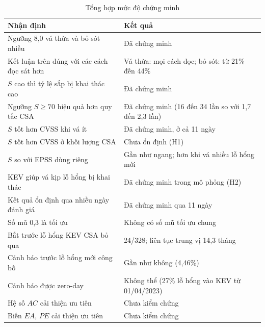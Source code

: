\documentclass[conference]{IEEEtran}
\begin{document}
\begin{table}[htbp]
\caption{Tổng hợp mức độ chứng minh}\label{tab:tonghop}
\centering
\small
\begin{tabular}{L{4.5cm}L{3.2cm}}
\toprule
Nhận định & Kết quả \\
\midrule
Ngưỡng 8,0 vá thừa và bỏ sót nhiều & Đã chứng minh \\
Kết luận trên đúng với các cách đọc sát hơn & Vá thừa: mọi cách đọc; bỏ sót: từ 21\% đến 44\% \\
$S$ cao thì tỷ lệ sắp bị khai thác cao & Đã chứng minh \\
Ngưỡng $S \ge 70$ hiệu quả hơn quy tắc CSA & Đã chứng minh (16 đến 34 lần so với 1,7 đến 2,3 lần) \\
$S$ tốt hơn CVSS khi vá ít & Đã chứng minh, ở cả 11 ngày \\
$S$ tốt hơn CVSS ở khối lượng CSA & Chưa ổn định (H1) \\
$S$ so với EPSS dùng riêng & Gần như ngang; hơn khi vá nhiều lỗ hổng mới \\
KEV giúp vá kịp lỗ hổng bị khai thác & Đã chứng minh trong mô phỏng (H2) \\
Kết quả ổn định qua nhiều ngày đánh giá & Đã chứng minh qua 11 ngày \\
Số mũ 0,3 là tối ưu & Không có số mũ tối ưu chung \\
Bắt trước lỗ hổng KEV CSA bỏ qua & 24/328; liên tục trung vị 14,3 tháng \\
Cảnh báo trước lỗ hổng mới công bố & Gần như không (4,46\%) \\
Cảnh báo được zero-day & Không thể (27\% lỗ hổng vào KEV từ 01/04/2023) \\
Hệ số $AC$ cải thiện ưu tiên & Chưa kiểm chứng \\
Biến $\mathit{EA}$, $\mathit{PE}$ cải thiện ưu tiên & Chưa kiểm chứng \\
\bottomrule
\end{tabular}
\end{table}
\end{document}
